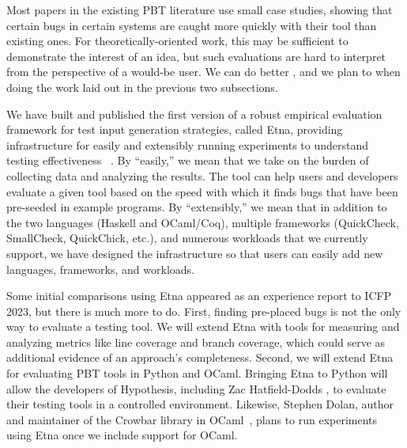 
%
%

Most papers in the existing PBT literature use small case studies,
showing that certain bugs in certain systems
are caught more quickly with their tool than existing ones. For
theoretically-oriented work, this may be sufficient
to demonstrate the interest of an idea, but such evaluations
are hard to interpret from the perspective of a would-be user.
We can do better , and we plan to when doing the work laid out in the previous
two subsections.

We have built and published the first version of a robust empirical evaluation
framework for
test input generation strategies, called Etna, providing infrastructure
for easily and extensibly running experiments to understand testing
effectiveness ~\cite{shi2023etna}.  By ``easily,'' we mean that we take on the burden of
collecting data and analyzing the results.  The tool
can help users and developers evaluate a given tool based on
the
speed with which it finds bugs that have been pre-seeded in example programs. By
``extensibly,'' we mean that in addition to the two languages (Haskell and
OCaml/Coq), multiple frameworks (QuickCheck, SmallCheck, QuickChick, etc.), and
numerous workloads that we currently support, we have designed the
infrastructure so that users can easily add new
languages, frameworks, and workloads.

Some initial comparisons using Etna appeared as an experience report to ICFP
2023, but there is much more to do. First, finding pre-placed bugs is not the
only way to evaluate a testing tool. We will extend Etna with
tools for measuring and analyzing metrics like line coverage and branch
coverage, which could serve as additional evidence of an approach's
completeness. Second, we will extend Etna for evaluating PBT
tools in Python and OCaml. Bringing Etna to Python will
allow the developers of Hypothesis, including Zac Hatfield-Dodds , to evaluate their testing tools in a controlled
environment. Likewise, Stephen Dolan, author and maintainer of
the Crowbar library in OCaml~\cite{dolan2017testing}, plans to run experiments using Etna once
we include support for OCaml.

